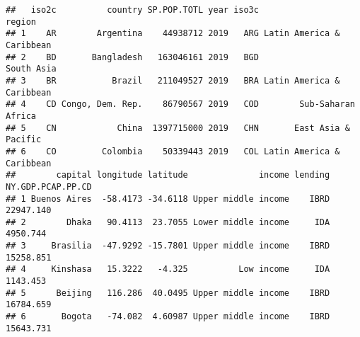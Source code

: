 \documentclass[
]{article}
\newenvironment{Shaded}{\begin{snugshade}}{\end{snugshade}}
\newcommand{\CommentTok}[1]{\textcolor[rgb]{0.56,0.35,0.01}{\textit{#1}}}
\newcommand{\DataTypeTok}[1]{\textcolor[rgb]{0.13,0.29,0.53}{#1}}
\newcommand{\DecValTok}[1]{\textcolor[rgb]{0.00,0.00,0.81}{#1}}
\newcommand{\KeywordTok}[1]{\textcolor[rgb]{0.13,0.29,0.53}{\textbf{#1}}}
\newcommand{\NormalTok}[1]{#1}
\newcommand{\OperatorTok}[1]{\textcolor[rgb]{0.81,0.36,0.00}{\textbf{#1}}}
\newcommand{\OtherTok}[1]{\textcolor[rgb]{0.56,0.35,0.01}{#1}}
\newcommand{\StringTok}[1]{\textcolor[rgb]{0.31,0.60,0.02}{#1}}
\begin{document}
\begin{Shaded}
\end{Shaded}

\begin{verbatim}
##   iso2c          country SP.POP.TOTL year iso3c                    region
## 1    AR        Argentina    44938712 2019   ARG Latin America & Caribbean
## 2    BD       Bangladesh   163046161 2019   BGD                South Asia
## 3    BR           Brazil   211049527 2019   BRA Latin America & Caribbean
## 4    CD Congo, Dem. Rep.    86790567 2019   COD        Sub-Saharan Africa
## 5    CN            China  1397715000 2019   CHN       East Asia & Pacific
## 6    CO         Colombia    50339443 2019   COL Latin America & Caribbean
##        capital longitude latitude              income lending NY.GDP.PCAP.PP.CD
## 1 Buenos Aires  -58.4173 -34.6118 Upper middle income    IBRD         22947.140
## 2        Dhaka   90.4113  23.7055 Lower middle income     IDA          4950.744
## 3     Brasilia  -47.9292 -15.7801 Upper middle income    IBRD         15258.851
## 4     Kinshasa   15.3222   -4.325          Low income     IDA          1143.453
## 5      Beijing   116.286  40.0495 Upper middle income    IBRD         16784.659
## 6       Bogota   -74.082  4.60987 Upper middle income    IBRD         15643.731
\end{verbatim}
\end{document}
